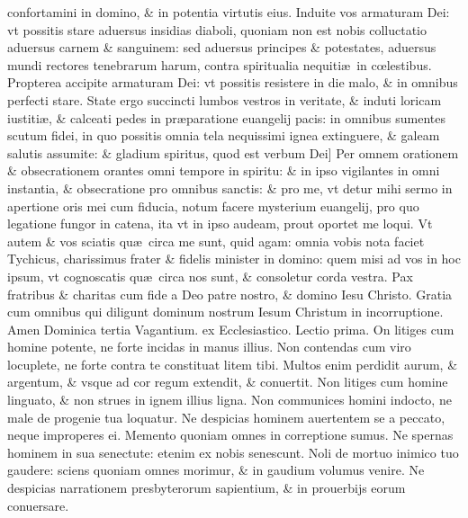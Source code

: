 \documentclass[a5paper,10pt]{book}
\def\leftmarginnote{%
	\lrmarginnote{\hskip -\marginparsep \hskip -6.5em}}
\def\rightmarginnote{%
	\lrmarginnote{\hskip\columnwidth \hskip -1em}}
\def\ae{æ}
\def\oe{œ}
\begin{document}
\begin{multicols*}{2}
confortamini\rightmarginnote{B} in domino, \& in potentia virtutis eius.
Induite vos armaturam Dei: vt possitis stare aduersus insidias diaboli, quoniam non est nobis colluctatio aduersus carnem \& sanguinem: sed aduersus principes \& potestates, aduersus mundi rectores tenebrarum harum, contra spiritualia nequiti\ae \ in c\oe lestibus.
Propterea accipite armaturam Dei: vt possitis resistere in die malo, \& in omnibus perfecti stare. State ergo succincti lumbos vestros in veritate, \& induti loricam iustiti\ae , \& calceati pedes in pr\ae paratione euangelij pacis: in omnibus sumentes scutum fidei, in quo possitis omnia tela nequissimi ignea extinguere, \& galeam salutis assumite: \& gladium spiritus, quod est verbum Dei]
Per\rightmarginnote{C} omnem orationem \& obsecrationem orantes omni tempore in spiritu: \& in ipso vigilantes in omni
instantia, \& obsecratione pro omnibus sanctis: \& pro me, vt detur mihi sermo in apertione oris mei cum fiducia, notum facere mysterium euangelij, pro quo legatione fungor in catena, ita vt in ipso audeam, prout oportet me loqui.
Vt autem \& vos sciatis qu\ae \ circa me sunt, quid agam: omnia vobis nota faciet Tychicus, charissimus frater \& fidelis minister in domino: quem misi ad vos in hoc ipsum, vt cognoscatis qu\ae \ circa nos sunt, \& consoletur corda vestra.
Pax fratribus \& charitas cum fide a Deo patre nostro, \& domino Iesu Christo. Gratia cum omnibus qui diligunt dominum nostrum Iesum Christum in incorruptione. Amen
\newline {} \color{red} \hypertarget{SUN-TERTIA-VAGAN}{Dominica} tertia Vagantium. ex Ecclesiastico. \quad Lectio prima. \color{black}
\vspace{-.25em}
On\leftmarginnote{\begin{flushright}ca. 8.\end{flushright}} litiges cum homine potente, ne forte incidas in manus illius.
Non contendas cum viro locuplete, ne forte contra te constituat litem tibi. Multos enim perdidit aurum, \& argentum, \& vsque ad cor regum extendit, \& conuertit.
Non litiges cum homine linguato, \& non strues in ignem illius ligna. Non communices homini indocto, ne male de progenie tua loquatur.
Ne despicias hominem auertentem se a peccato, neque improperes ei. Memento quoniam omnes in correptione sumus. Ne spernas hominem in sua senectute: etenim ex nobis senescunt.
Noli de mortuo inimico tuo gaudere: sciens quoniam omnes morimur, \& in gaudium volumus venire. Ne despicias narrationem presbyterorum sapientium, \& in prouerbijs eorum conuersare.

\end{multicols*}
\end{document}
